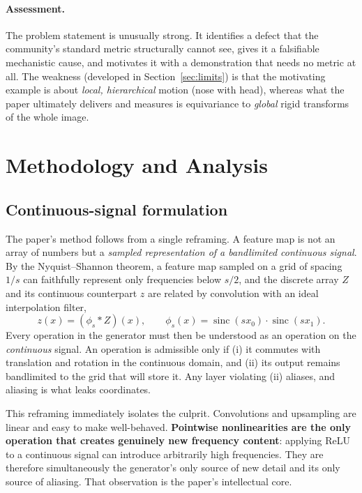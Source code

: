 \documentclass[11pt,a4paper]{article}
\begin{document}
\paragraph{Assessment.} The problem statement is unusually strong. It identifies
a defect that the community's standard metric structurally cannot see, gives it a
falsifiable mechanistic cause, and motivates it with a demonstration that needs no
metric at all. The weakness (developed in Section~\ref{sec:limits}) is that the
motivating example is about \emph{local, hierarchical} motion (nose with head),
whereas what the paper ultimately delivers and measures is equivariance to
\emph{global} rigid transforms of the whole image.

\section{Methodology and Analysis}

\subsection{Continuous-signal formulation}

The paper's method follows from a single reframing. A feature map is not an array
of numbers but a \emph{sampled representation of a bandlimited continuous
signal}. By the Nyquist--Shannon theorem, a feature map sampled on a grid of
spacing $1/s$ can faithfully represent only frequencies below $s/2$, and the
discrete array $Z$ and its continuous counterpart $z$ are related by convolution
with an ideal interpolation filter,
\begin{equation}
z(x) = (\phi_s * Z)(x), \qquad
\phi_s(x) = \operatorname{sinc}(s x_0)\cdot\operatorname{sinc}(s x_1).
\end{equation}
Every operation in the generator must then be understood as an operation on the
\emph{continuous} signal. An operation is admissible only if (i) it commutes with
translation and rotation in the continuous domain, and (ii) its output remains
bandlimited to the grid that will store it. Any layer violating (ii) aliases, and
aliasing is what leaks coordinates.

This reframing immediately isolates the culprit. Convolutions and upsampling are
linear and easy to make well-behaved. \textbf{Pointwise nonlinearities are the
only operation that creates genuinely new frequency content}: applying ReLU to
a continuous signal can introduce arbitrarily high frequencies. They are
therefore simultaneously the generator's only source of new detail and its only
source of aliasing. That observation is the paper's intellectual core.
\end{document}
